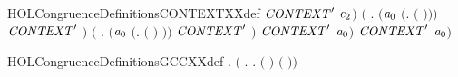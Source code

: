 \begin{SaveVerbatim}{HOLCongruenceDefinitionsCONTEXTXXdef}
                      \ensuremath{\HOLBoundVar{CONTEXT}\sp{\prime}} \ensuremath{\HOLBoundVar{e}\sb{\mathrm{2}}}\ensuremath{)} \HOLSymConst{\HOLTokenDisj{}}
                 \ensuremath{(}\HOLSymConst{\HOLTokenExists{}} . \ensuremath{(}\ensuremath{\HOLBoundVar{a}\sb{\mathrm{0}}} \HOLSymConst{\ensuremath{=}} \ensuremath{(}\HOLTokenLambda{}.   \ensuremath{(} \ensuremath{)}\ensuremath{)}\ensuremath{)} \HOLSymConst{\HOLTokenConj{}} \ensuremath{\HOLBoundVar{CONTEXT}\sp{\prime}} \ensuremath{)} \HOLSymConst{\HOLTokenDisj{}}
                 \ensuremath{(}\HOLSymConst{\HOLTokenExists{}} .
                      \ensuremath{(}\ensuremath{\HOLBoundVar{a}\sb{\mathrm{0}}} \HOLSymConst{\ensuremath{=}} \ensuremath{(}\HOLTokenLambda{}.  \ensuremath{(} \ensuremath{)} \ensuremath{)}\ensuremath{)} \HOLSymConst{\HOLTokenConj{}} \ensuremath{\HOLBoundVar{CONTEXT}\sp{\prime}} \ensuremath{)} \HOLSymConst{\HOLTokenImp{}}
                 \ensuremath{\HOLBoundVar{CONTEXT}\sp{\prime}} \ensuremath{\HOLBoundVar{a}\sb{\mathrm{0}}}\ensuremath{)} \HOLSymConst{\HOLTokenImp{}}
            \ensuremath{\HOLBoundVar{CONTEXT}\sp{\prime}} \ensuremath{\HOLBoundVar{a}\sb{\mathrm{0}}}\ensuremath{)}
\end{SaveVerbatim}
\newcommand{\HOLCongruenceDefinitionsCONTEXTXXdef}{\UseVerbatim{HOLCongruenceDefinitionsCONTEXTXXdef}}
\begin{SaveVerbatim}{HOLCongruenceDefinitionsGCCXXdef}
\HOLTokenTurnstile{} \HOLSymConst{\HOLTokenForall{}}.   \HOLSymConst{\ensuremath{=}} \ensuremath{(}\HOLTokenLambda{} . \HOLSymConst{\HOLTokenForall{}}.   \HOLSymConst{\HOLTokenImp{}}  \ensuremath{(} \ensuremath{)} \ensuremath{(} \ensuremath{)}\ensuremath{)}
\end{SaveVerbatim}
\newcommand{\HOLCongruenceDefinitionsGCCXXdef}{\UseVerbatim{HOLCongruenceDefinitionsGCCXXdef}}
